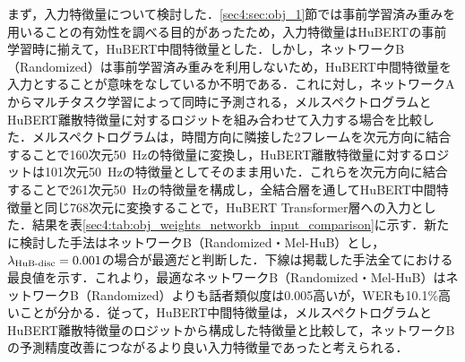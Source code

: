 まず，入力特徴量について検討した．\ref{sec4:sec:obj_1}節では事前学習済み重みを用いることの有効性を調べる目的があったため，入力特徴量はHuBERTの事前学習時に揃えて，HuBERT中間特徴量とした．しかし，ネットワークB（Randomized）は事前学習済み重みを利用しないため，HuBERT中間特徴量を入力とすることが意味をなしているか不明である．これに対し，ネットワークAからマルチタスク学習によって同時に予測される，メルスペクトログラムとHuBERT離散特徴量に対するロジットを組み合わせて入力する場合を比較した．メルスペクトログラムは，時間方向に隣接した2フレームを次元方向に結合することで160次元\SI{50}{\Hz}の特徴量に変換し，HuBERT離散特徴量に対するロジットは101次元\SI{50}{\Hz}の特徴量としてそのまま用いた．これらを次元方向に結合することで261次元\SI{50}{\Hz}の特徴量を構成し，全結合層を通してHuBERT中間特徴量と同じ768次元に変換することで，HuBERT Transformer層への入力とした．結果を表\ref{sec4:tab:obj_weights_networkb_input_comparison}に示す．新たに検討した手法はネットワークB（Randomized・Mel-HuB）とし，$\lambda_{\text{HuB-disc}} = 0.001$の場合が最適だと判断した．下線は掲載した手法全てにおける最良値を示す．これより，最適なネットワークB（Randomized・Mel-HuB）はネットワークB（Randomized）よりも話者類似度は0.005高いが，WERも10.1\%高いことが分かる．従って，HuBERT中間特徴量は，メルスペクトログラムとHuBERT離散特徴量のロジットから構成した特徴量と比較して，ネットワークBの予測精度改善につながるより良い入力特徴量であったと考えられる．

